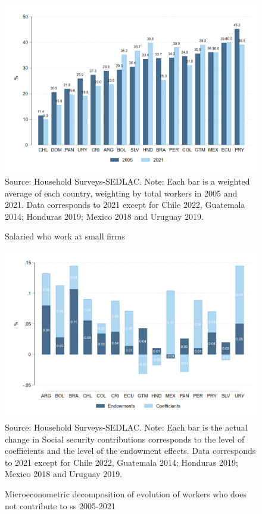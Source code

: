 \documentclass[english]{article}
\begin{document}
\begin{itemize}
\begin{figure}[!htb]
    \justifying
     \caption{Salaried who work at small firms}     
     \includegraphics[scale=.3]{latex/figures/Snapshot/snapshot_dependents_small.png}
    \label{fig:SalariedSmall}
    \footnotesize{Source: Household Surveys-SEDLAC.}
    \footnotesize{Note: Each bar is a weighted average of each country, weighting by total workers in 2005 and 2021.  Data corresponds to 2021 except for Chile 2022, Guatemala 2014; Honduras 2019; Mexico 2018 and Uruguay 2019.}
\end{figure}

      

\begin{figure}[!htb]
        \justifying
        \caption{Microeconometric decomposition of evolution of workers who does not contribute to ss 2005-2021}     
        \includegraphics[scale=.3]{latex/figures/Snapshot/Oaxaca decomposition level.png}
        \label{fig:Oaxaca_level}
        \footnotesize{Source: Household Surveys-SEDLAC.}
        \footnotesize{Note: Each bar is the actual change in Social security contributions corresponds to the level of coefficients and the level of the endowment effects.  Data corresponds to 2021 except for Chile 2022, Guatemala 2014; Honduras 2019; Mexico 2018 and Uruguay 2019.}
        \end{figure}
\end{itemize}
\end{document}
